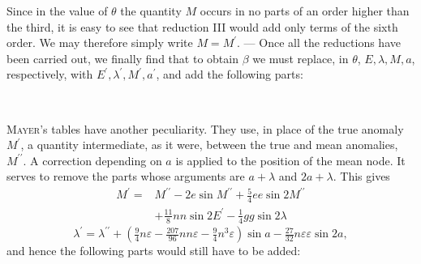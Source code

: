 \clearpage
\begingroup
{}
\renewcommand{\headrulewidth}{0pt}
\par\noindent\hspace*{\parindent}Since in the value of \(\theta\) the quantity \(M\) occurs in no parts of an order
higher than the third, it is easy to see that reduction
III would add only terms of the sixth order. We may therefore simply
write \(M=M^{\prime}\). — Once all the reductions have been carried out,
we finally find that to obtain \(\beta\) we must replace, in \(\theta\), \(E,\lambda,M,a\), respectively, with
\(E^{\prime},\lambda^{\prime},M^{\prime},a^{\prime}\), and add the following parts:
\begin{center}
\\[4pt]
\end{center}
\par\noindent\hspace*{\parindent}\textsc{Mayer}'s tables have another peculiarity. They use,
in place of the true anomaly \(M^{\prime}\), a quantity intermediate, as it were,
between the true and mean anomalies, \(M^{\prime\prime}\). A correction
depending on \(a\) is applied to the position of the mean node.
It serves to remove the parts whose arguments are \(a+\lambda\) and \(2a+\lambda\).
This gives
\[
\begin{aligned}
M^{\prime}={}&M^{\prime\prime}-2e\sin M^{\prime\prime}
 +\tfrac54ee\sin2M^{\prime\prime}\\
&+\tfrac{11}{8}nn\sin2E^{\prime}-\tfrac14gg\sin2\lambda
\end{aligned}
\]
\[
\lambda^{\prime}=\lambda^{\prime\prime}
 +\left(\tfrac94n\varepsilon-\tfrac{207}{96}nn\varepsilon
 -\tfrac94n^3\varepsilon\right)\sin a
 -\tfrac{27}{32}n\varepsilon\varepsilon\sin2a,
\]
\noindent and hence the following parts would still have to be added:
\begin{center}
\\[4pt]
\end{center}
